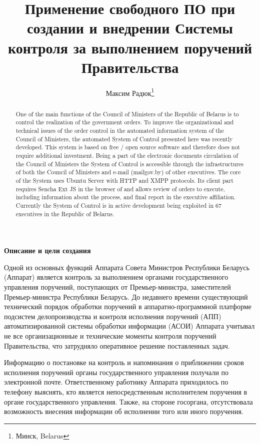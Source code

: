 \documentclass[10pt, a5paper]{article}
\begin{document}
\title{Применение свободного ПО при создании и внедрении Системы контроля за выполнением поручений Правительства}%

\author{Максим Радюк\footnote{Минск, Belarus}}
\maketitle

\begin{abstract}
One of the main functions of the Council of Ministers of the Republic of Belarus is to control the realization of the government orders. To improve the organizational and technical issues of the order control in the automated information system of the Council of Ministers, the automated System of Control presented here was recently developed.
This system is based on free / open source software and therefore does not require additional investment. Being a part of the electronic documents circulation of the Council of Ministers the System of Control is accessible through the infrastructures of both the Council of Ministers and e-mail (mailgov.by) of other executives. The core of the System uses Ubuntu Server with HTTP and XMPP protocols. Its client part requires Sencha Ext JS in the browser of and allows review of orders to execute, including information about the process, and final report in the executive affiliation.
Currently the System of Control is in active development being exploited in 67 executives in the Republic of Belarus.
\end{abstract}

\textbf{Описание и цели создания}

Одной из основных функций Аппарата Совета Министров Республики Беларусь (Аппарат) является контроль за выполнением органами государственного управления поручений, поступающих от Премьер-министра, заместителей Премьер-министра Республики Беларусь.  До недавнего времени существующий технический порядок обработки поручений в аппаратно-программной платформе подсистем делопроизводства и контроля исполнения поручений (АПП) автоматизированной системы обработки информации \linebreak (АСОИ) Аппарата учитывал не все организационные и технические моменты контроля поручений Правительства, что затрудняло оперативное решение поставленных задач.

Информацию о постановке на контроль и напоминания о приближении сроков исполнения поручений органы государственного управления получали по электронной почте. Ответственному работнику Аппарата приходилось по телефону выяснять, кто является непосредственным исполнителем поручения в органе государственного управления. Также, на стороне госоргана, отсутствовала возможность внесения информации об исполнении того или иного поручения.
\end{document}
